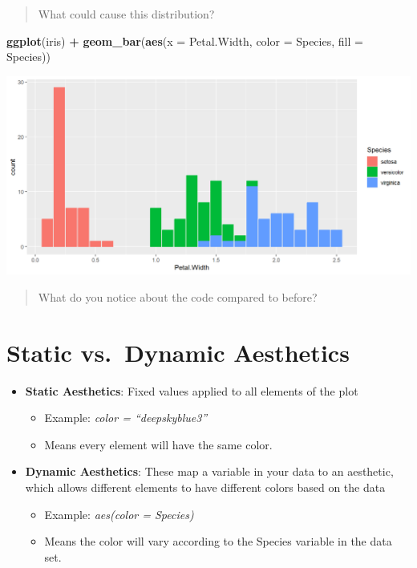 \documentclass[
]{book}
\newenvironment{Shaded}{\begin{snugshade}}{\end{snugshade}}
\newcommand{\AttributeTok}[1]{\textcolor[rgb]{0.13,0.29,0.53}{#1}}
\newcommand{\FunctionTok}[1]{\textcolor[rgb]{0.13,0.29,0.53}{\textbf{#1}}}
\newcommand{\NormalTok}[1]{#1}
\newcommand{\SpecialCharTok}[1]{\textcolor[rgb]{0.81,0.36,0.00}{\textbf{#1}}}
\providecommand{\tightlist}{%
  \setlength{\itemsep}{0pt}\setlength{\parskip}{0pt}}
\begin{document}
\begin{quote}
What could cause this distribution?
\end{quote}

\begin{Shaded}
\begin{Highlighting}[]
\FunctionTok{ggplot}\NormalTok{(iris) }\SpecialCharTok{+} 
  \FunctionTok{geom\_bar}\NormalTok{(}\FunctionTok{aes}\NormalTok{(}\AttributeTok{x =}\NormalTok{ Petal.Width, }\AttributeTok{color =}\NormalTok{ Species, }\AttributeTok{fill =}\NormalTok{ Species))}
\end{Highlighting}
\end{Shaded}

\begin{flushleft}\includegraphics{_main_files/figure-html/bpcf2-1} \end{flushleft}

\begin{quote}
What do you notice about the code compared to before?
\end{quote}

\section{Static vs.~Dynamic Aesthetics}\label{static-vs.-dynamic-aesthetics}

\begin{itemize}
\tightlist
\item
  \textbf{Static Aesthetics}: Fixed values applied to all elements of the plot

  \begin{itemize}
  \tightlist
  \item
    Example: \emph{color = ``deepskyblue3''}
  \item
    Means every element will have the same color.
  \end{itemize}
\item
  \textbf{Dynamic Aesthetics}: These map a variable in your data to an aesthetic, which allows different elements to have different colors based on the data

  \begin{itemize}
  \tightlist
  \item
    Example: \emph{aes(color = Species)}
  \item
    Means the color will vary according to the Species variable in the data set.
  \end{itemize}
\end{itemize}
\end{document}
